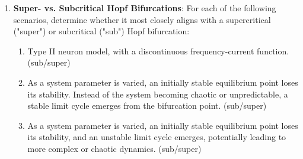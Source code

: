 \documentclass[11pt,letterpaper]{article}
\begin{document}
\begin{enumerate}
    \item \textbf{Super- vs. Subcritical Hopf Bifurcations}: For each of the following scenarios, determine whether it most closely aligns with a supercritical ("super") or subcritical ("sub") Hopf bifurcation:
    \begin{enumerate}
        \item Type II neuron model, with a discontinuous frequency-current function. (sub/super)
        \item As a system parameter is varied, an initially stable equilibrium point loses its stability. Instead of the system becoming chaotic or unpredictable, a stable limit cycle emerges from the bifurcation point. (sub/super)
        \item As a system parameter is varied, an initially stable equilibrium point loses its stability, and an unstable limit cycle emerges, potentially leading to more complex or chaotic dynamics. (sub/super)
    \end{enumerate}
    

\end{enumerate}
\pagebreak
\end{document}
